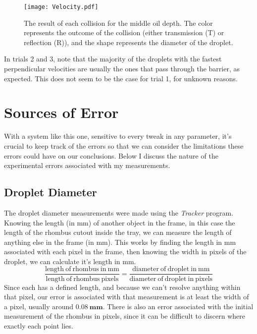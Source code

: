 \begin{figure}[h!]
	\centering
	\texttt{[image: Velocity.pdf]}
	\caption{The result of each collision for the middle oil depth. The color represents the outcome of the collision (either transmission (T) or reflection (R)), and the shape represents the diameter of the droplet.}
	\label{vel}
\end{figure}

In trials 2 and 3, note that the majority of the droplets with the fastest perpendicular velocities are usually the ones that pass through the barrier, as expected. This does not seem to be the case for trial 1, for unknown reasons. 



\section{Sources of Error}

    With a system like this one, sensitive to every tweak in any parameter, it's crucial to keep track of the errors so that we can consider the limitations these errors could have on our conclusions. Below I discuss the nature of the experimental errors associated with my measurements.
       
    \subsection{Droplet Diameter}
    The droplet diameter measurements were made using the \textit{Tracker} program. Knowing the length (in mm) of another object in the frame, in this case the length of the rhombus cutout inside the tray, we can measure the length of anything else in the frame (in mm). This works by finding the length in mm associated with each pixel in the frame, then knowing the width in pixels of the droplet, we can calculate it's length in mm.   
$$ 
\frac{\mathrm{length~of~rhombus~in~mm}}{\mathrm{length~of~rhombus~pixels}}= \frac{\mathrm{diameter~of~droplet~in~mm}}{\mathrm{diameter~of~droplet~in~pixels}} 
$$ 
Since each has a defined length, and because we can't resolve anything within that pixel, our error is associated with that measurement is at least the width of a pixel, usually around $\mathbf{0.08~\mathrm{\textbf{mm}}}$. There is also an error associated with the initial measurement of the rhombus in pixels, since it can be difficult to discern where exactly each point lies.

